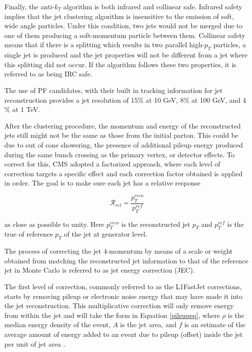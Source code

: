Finally, the anti-$k_{T}$ algorithm is both infrared and collinear safe. Infrared safety implies that the jet clustering algorithm is insensitive to the emission of soft, wide angle particles. Under this condition, two jets would not be merged due to one of them producing a soft-momentum particle between them. Collinear safety means that if there is a splitting which results in two parallel high-$p_{T}$ particles, a single jet is produced and the jet properties will not be different from a jet where this splitting did not occur. If the algorithm follows these two properties, it is referred to as being IRC safe.

The use of PF candidates, with their built in tracking information for jet reconstruction provides a jet resolution of 15$\%$ at 10 GeV, 8$\%$ at 100 GeV, and 4$\%$ at 1 TeV\cite{CMS-PAS-PFT-09-001}. 

After the clustering procedure, the momentum and energy of the reconstructed jets still might not be the same as those from the initial parton. This could be due to out of cone showering, the presence of additional pileup energy produced during the same bunch crossing as the primary vertex, or detector effects. To correct for this, CMS adopted a factorized approach\cite{JINST2011}, where each level of correction targets a specific effect and each correction factor obtained is applied in order. The goal is to make sure each jet has a relative response

\begin{equation}
\mathcal{R}_{rel} = \frac{p_{T}^{reco}}{p_{T}^{ref}} 
\end{equation}

as close as possible to unity. Here $p_{T}^{reco}$ is the reconstructed jet $p_{T}$ and $p_{T}^{ref}$ is the true of reference $p_{T}$ of the jet at generator level. 

The process of correcting the jet 4-momentum by means of a scale or weight obtained from matching the reconstructed jet information to that of the reference jet in Monte Carlo is referred to as jet energy correction (JEC).

The first level of correction, commonly referred to as the L1FastJet\cite{Cacciari2007} corrections, starts by removing pileup or electronic noise energy that may have made it into the jet reconstruction. This multiplicative correction will only remove energy from within the jet and will take the form in Equation \ref{pileupeq}, where $\rho$ is the median energy density of the event, $A$ is the jet area, and $f$ is an estimate of the average amount of energy added to an event due to pileup (offset) inside the jet per unit of jet area \cite{JINST2011,Cacciari2007}.

